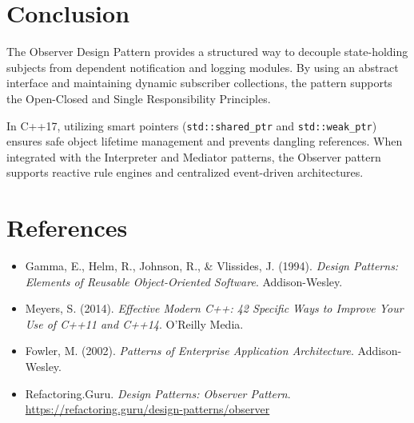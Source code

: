 \documentclass[12pt,a4paper]{article}
\begin{document}
\section{Conclusion}
The Observer Design Pattern provides a structured way to decouple state-holding subjects from dependent notification and logging modules. By using an abstract interface and maintaining dynamic subscriber collections, the pattern supports the Open-Closed and Single Responsibility Principles.

In C++17, utilizing smart pointers (\texttt{std::shared\_ptr} and \texttt{std::weak\_ptr}) ensures safe object lifetime management and prevents dangling references. When integrated with the Interpreter and Mediator patterns, the Observer pattern supports reactive rule engines and centralized event-driven architectures.

\newpage

\section*{References}
\begin{itemize}
    \item Gamma, E., Helm, R., Johnson, R., \& Vlissides, J. (1994). \textit{Design Patterns: Elements of Reusable Object-Oriented Software}. Addison-Wesley.
    \item Meyers, S. (2014). \textit{Effective Modern C++: 42 Specific Ways to Improve Your Use of C++11 and C++14}. O'Reilly Media.
    \item Fowler, M. (2002). \textit{Patterns of Enterprise Application Architecture}. Addison-Wesley.
    \item Refactoring.Guru. \textit{Design Patterns: Observer Pattern}. \url{https://refactoring.guru/design-patterns/observer}
\end{itemize}
\end{document}
